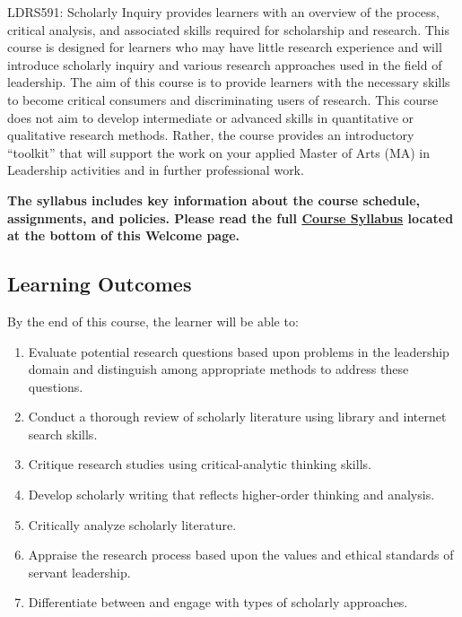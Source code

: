 \documentclass[
  letterpaper,
  DIV=11,
  numbers=noendperiod]{scrreprt}
\providecommand{\tightlist}{%
  \setlength{\itemsep}{0pt}\setlength{\parskip}{0pt}}\usepackage{longtable,booktabs,array}
\begin{document}
LDRS591: Scholarly Inquiry provides learners with an overview of the
process, critical analysis, and associated skills required for
scholarship and research. This course is designed for learners who may
have little research experience and will introduce scholarly inquiry and
various research approaches used in the field of leadership. The aim of
this course is to provide learners with the necessary skills to become
critical consumers and discriminating users of research. This course
does not aim to develop intermediate or advanced skills in quantitative
or qualitative research methods. Rather, the course provides an
introductory ``toolkit'' that will support the work on your applied
Master of Arts (MA) in Leadership activities and in further professional
work.

\textbf{The syllabus includes key information about the course schedule,
assignments, and policies. Please read the full
\href{https://learn.twu.ca/mod/resource/view.php?id=1171447}{Course
Syllabus} located at the bottom of this Welcome page.}

\subsection*{Learning Outcomes}\label{learning-outcomes}

By the end of this course, the learner will be able to:

\begin{enumerate}
\def\labelenumi{\arabic{enumi}.}
\tightlist
\item
  Evaluate potential research questions based upon problems in the
  leadership domain and distinguish among appropriate methods to address
  these questions.
\item
  Conduct a thorough review of scholarly literature using library and
  internet search skills.
\item
  Critique research studies using critical-analytic thinking skills.
\item
  Develop scholarly writing that reflects higher-order thinking and
  analysis.
\item
  Critically analyze scholarly literature.
\item
  Appraise the research process based upon the values and ethical
  standards of servant leadership.
\item
  Differentiate between and engage with types of scholarly approaches.
\end{enumerate}
\end{document}
